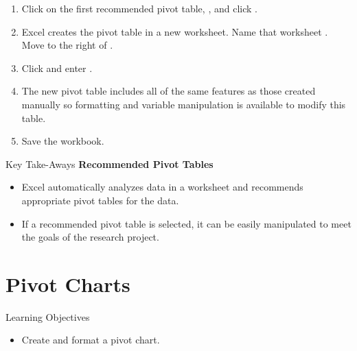 \begin{enumerate}[resume]
	\item Click on the first recommended pivot table, , and click .
	\item Excel creates the pivot table in a new worksheet. Name that worksheet .
	Move  to the right of .
	\item Click  and enter .
	\item The new pivot table includes all of the same features as those created manually so formatting and variable manipulation is available to modify this table.
	\item Save the  workbook.
\end{enumerate}

\begin{center}
	\begin{tkwbox}{Key Take-Aways}
		\textbf{Recommended Pivot Tables}
		\\
		\begin{itemize}
			\setlength{\itemsep}{0pt}
			\setlength{\parskip}{0pt}
			\setlength{\parsep}{0pt}
			
			\item Excel automatically analyzes data in a worksheet and recommends appropriate pivot tables for the data.
			\item If a recommended pivot table is selected, it can be easily manipulated to meet the goals of the research project.
			
		\end{itemize}
	\end{tkwbox}
\end{center}

\section{Pivot Charts}

\begin{center}
	\begin{objbox}{Learning Objectives}
		\begin{itemize}
			\setlength{\itemsep}{0pt}
			\setlength{\parskip}{0pt}
			\setlength{\parsep}{0pt}
			
			\item Create and format a pivot chart.
			
		\end{itemize}
	\end{objbox}
\end{center}

